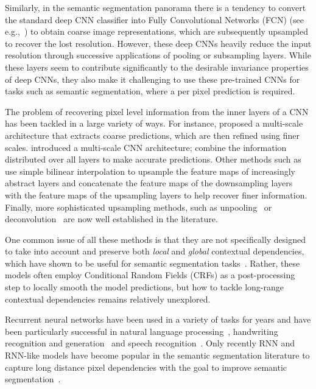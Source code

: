 Similarly, in the semantic segmentation panorama there is a tendency to convert
the standard deep CNN classifier into Fully Convolutional Networks (FCN) (see
e.g.,~\citep{long2014fully,noh2015learning, badrinarayanan2015segnet,
Ronneberger2015}) to obtain coarse image representations, which are
subsequently upsampled to recover the lost resolution. However, these deep CNNs
heavily reduce the input resolution through successive applications of pooling
or subsampling layers. While these layers seem to contribute significantly to
the desirable invariance properties of deep CNNs, they also make it challenging
to use these pre-trained CNNs for tasks such as semantic segmentation, where a
per pixel prediction is required.

The problem of recovering pixel level information from the inner layers of a
CNN has been tackled in a large variety of ways. For instance,
\citep{eigen2015predicting} proposed a multi-scale architecture that extracts
coarse predictions, which are then refined using finer scales.
\cite{Farabet:2013} introduced a multi-scale CNN architecture;
\cite{Hariharan2015} combine the information distributed over all layers to
make accurate predictions. Other methods such
as~\citep{long2014fully,badrinarayanan2015segnet} use simple bilinear
interpolation to upsample the feature maps of increasingly abstract layers and
\cite{Ronneberger2015} concatenate the feature maps of the downsampling layers
with the feature maps of the upsampling layers to help recover finer
information. Finally, more sophisticated upsampling methods, such as
unpooling~\citep{noh2015learning,badrinarayanan2015segnet} or
deconvolution~\citep{long2014fully} are now well established in the literature.

One common issue of all these methods is that they are not specifically
designed to take into account and preserve both \emph{local} and \emph{global}
contextual dependencies, which have shown to be useful for semantic
segmentation tasks~\citep{Singh2013,Gatta14-deepvision}. Rather, these models
often employ Conditional Random Fields (CRFs) as a post-processing step to
locally smooth the model predictions, but how to tackle long-range contextual
dependencies remains relatively unexplored.

Recurrent neural networks have been used in a variety of tasks for years and
have been particularly successful in natural language processing~\citep[see,
e.g.,][]{Mikolov-thesis-2012,Sutskever-et-al-NIPS2014,Cho2014}, handwriting
recognition and generation~\citep[see, e.g.,][]{Graves+Schmidhuber-2009,
Graves-et-al-NIPS2007,Graves-arxiv2013} and speech recognition~\citep[see,
e.g.,][]{Chorowski-et-al-arxiv2014,Graves+Jaitly-ICML2014}. Only recently RNN
and RNN-like models have become popular in the semantic segmentation literature
to capture long distance pixel dependencies with the goal to improve semantic
segmentation~\citep{Pinheiro:2014,Gatta14-deepvision,chen2015semantic,
byeon2015scene,stollenga2015parallel}.

